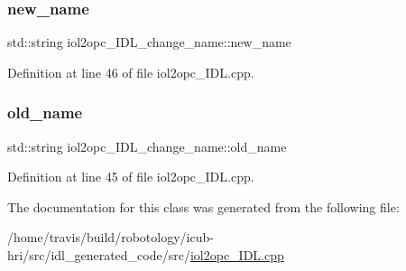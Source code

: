 \subsubsection{\texorpdfstring{new\+\_\+name}{new\_name}}
{\footnotesize\ttfamily std\+::string iol2opc\+\_\+\+I\+D\+L\+\_\+change\+\_\+name\+::new\+\_\+name}



Definition at line 46 of file iol2opc\+\_\+\+I\+D\+L.\+cpp.

\mbox{\label{classiol2opc__IDL__change__name_aed17f20d8287ee82fb764e15008f47f7}} 
\subsubsection{\texorpdfstring{old\+\_\+name}{old\_name}}
{\footnotesize\ttfamily std\+::string iol2opc\+\_\+\+I\+D\+L\+\_\+change\+\_\+name\+::old\+\_\+name}



Definition at line 45 of file iol2opc\+\_\+\+I\+D\+L.\+cpp.



The documentation for this class was generated from the following file\+:\begin{DoxyCompactItemize}
\item 
/home/travis/build/robotology/icub-\/hri/src/idl\+\_\+generated\+\_\+code/src/\hyperlink{iol2opc__IDL_8cpp}{iol2opc\+\_\+\+I\+D\+L.\+cpp}\end{DoxyCompactItemize}
